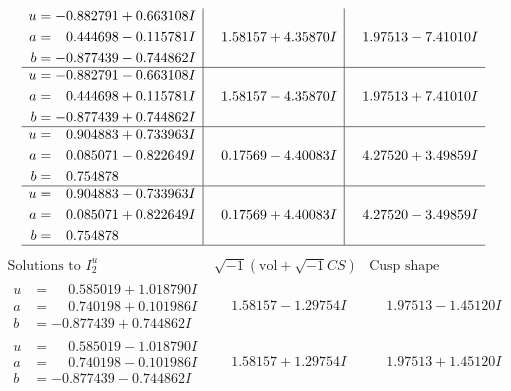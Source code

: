 \documentclass[1p]{elsarticle_modified}
\theoremstyle{definition}
\newcommand{\I}{\sqrt{-1}}
\begin{document}
$$\begin{array}{c|c|c}
\begin{aligned}
u &= -0.882791 + 0.663108 I \\
a &= \phantom{-}0.444698 - 0.115781 I \\
b &= -0.877439 - 0.744862 I\end{aligned}
 & \phantom{-}1.58157 + 4.35870 I & \phantom{-}1.97513 - 7.41010 I \\ \hline\begin{aligned}
u &= -0.882791 - 0.663108 I \\
a &= \phantom{-}0.444698 + 0.115781 I \\
b &= -0.877439 + 0.744862 I\end{aligned}
 & \phantom{-}1.58157 - 4.35870 I & \phantom{-}1.97513 + 7.41010 I \\ \hline\begin{aligned}
u &= \phantom{-}0.904883 + 0.733963 I \\
a &= \phantom{-}0.085071 - 0.822649 I \\
b &= \phantom{-}0.754878\phantom{ +0.000000I}\end{aligned}
 & \phantom{-}0.17569 - 4.40083 I & \phantom{-}4.27520 + 3.49859 I \\ \hline\begin{aligned}
u &= \phantom{-}0.904883 - 0.733963 I \\
a &= \phantom{-}0.085071 + 0.822649 I \\
b &= \phantom{-}0.754878\phantom{ +0.000000I}\end{aligned}
 & \phantom{-}0.17569 + 4.40083 I & \phantom{-}4.27520 - 3.49859 I\\
 \hline 
 \end{array}$$\newpage$$\begin{array}{c|c|c}  
\text{Solutions to }I^u_{2}& \I (\text{vol} + \sqrt{-1}CS) & \text{Cusp shape}\\
 \hline 
\begin{aligned}
u &= \phantom{-}0.585019 + 1.018790 I \\
a &= \phantom{-}0.740198 + 0.101986 I \\
b &= -0.877439 + 0.744862 I\end{aligned}
 & \phantom{-}1.58157 - 1.29754 I & \phantom{-}1.97513 - 1.45120 I \\ \hline\begin{aligned}
u &= \phantom{-}0.585019 - 1.018790 I \\
a &= \phantom{-}0.740198 - 0.101986 I \\
b &= -0.877439 - 0.744862 I\end{aligned}
 & \phantom{-}1.58157 + 1.29754 I & \phantom{-}1.97513 + 1.45120 I \\ \hline\begin{aligned}

\end{aligned}
\end{array}$$
\end{document}
